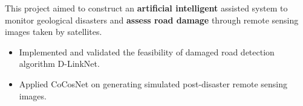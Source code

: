 \documentclass{resume}
\begin{document}
This project aimed to construct an \textbf{artificial intelligent} assisted system to monitor geological disasters and \textbf{assess road damage} through remote sensing images taken by satellites. 
\begin{itemize}
  \item Implemented and validated the feasibility of damaged road detection algorithm D-LinkNet.
  \item Applied CoCosNet on generating simulated post-disaster remote sensing images.
\end{itemize}


\end{document}
